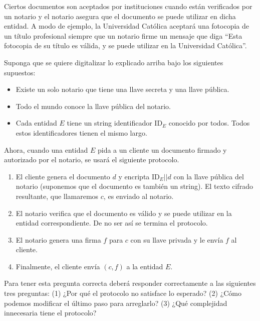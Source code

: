 
Ciertos documentos son aceptados por instituciones cuando están verificados por un notario y el notario asegura que el documento se puede utilizar en dicha entidad. A modo de ejemplo, la Universidad Católica aceptará una fotocopia de un título profesional siempre que un notario firme un mensaje que diga ``Esta fotocopia de su título es válida, y se puede utilizar en la Universidad Católica''.

Suponga que se quiere digitalizar lo explicado arriba bajo los siguientes supuestos:
\begin{itemize}
  \item Existe un solo notario que tiene una llave secreta y una llave pública.
  \item Todo el mundo conoce la llave pública del notario.
  \item Cada entidad $E$ tiene un string identificador $\text{ID}_E$ conocido por todos. Todos estos identificadores tienen el mismo largo.
\end{itemize}

Ahora, cuando una entidad $E$ pida a un cliente un documento firmado y autorizado por el notario, se usará el siguiente protocolo.

\begin{enumerate}
  \item El cliente genera el documento $d$ y encripta $\text{ID}_E || d$ con la llave pública del notario (suponemos que el documento es también un string). El texto cifrado resultante, que llamaremos $c$, es enviado al notario.
  \item El notario verifica que el documento es válido y se puede utilizar en la entidad correspondiente. De no ser así se termina el protocolo.
  \item El notario genera una firma $f$ para $c$ con su llave privada y le envía $f$ al cliente.
  \item Finalmente, el cliente envía $(c,f)$ a la entidad $E$.
\end{enumerate}

Para tener esta pregunta correcta deberá responder correctamente a las siguientes tres preguntas:
(1) ¿Por qué el protocolo no satisface lo esperado? (2) ¿Cómo podemos modificar el último paso para arreglarlo? (3) ¿Qué complejidad innecesaria tiene el protocolo?

